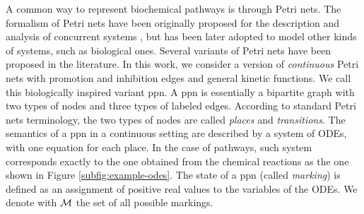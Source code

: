 A common way to represent biochemical pathways is through Petri nets. The formalism of Petri nets have been originally proposed for the description and analysis of concurrent systems \citep{peterson1977petri}, but has been later adopted to model other kinds of systems, such as biological ones. Several variants of Petri nets have been proposed in the literature. In this work, we consider a version of \emph{continuous} Petri nets \citep{gilbert2007petri} with promotion and inhibition edges and general kinetic functions. We call this biologically inspired variant \gls{ppn}. A \gls{ppn} is essentially a bipartite graph with two types of nodes and three types of labeled edges. According to standard Petri nets terminology, the two types of nodes are called \emph{places} and \emph{transitions}. The semantics of a \gls{ppn} in a continuous setting are described by a system of ODEs, with one equation for each place. In the case of pathways, such system corresponds exactly to the one obtained from the chemical reactions as the one shown in Figure \ref{subfig:example-odes}. The state of a \gls{ppn} (called \emph{marking}) is defined as an assignment of positive real values to the variables of the ODEs. We denote with $\Cal{M}$ the set of all possible markings.

